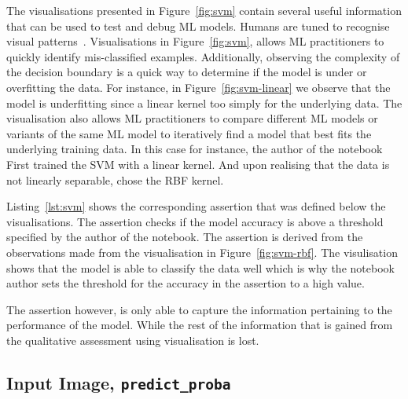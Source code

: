 \documentclass[conference]{IEEEtran}
\begin{document}
The visualisations presented in Figure~\ref{fig:svm} contain several useful information that can be used to test and debug ML models. Humans are tuned to recognise visual patterns~\cite{CITEME}. Visualisations in Figure~\ref{fig:svm}, allows ML practitioners to quickly identify mis-classified examples. Additionally, observing the complexity of the decision boundary is a quick way to determine if the model is under or overfitting the data. For instance, in Figure~\ref{fig:svm-linear} we observe that the model is underfitting since a linear kernel too simply for the underlying data. The visualisation also allows ML practitioners to compare different ML models or variants of the same ML model to iteratively find a model that best fits the underlying training data. In this case for instance, the author of the notebook First trained the SVM with a linear kernel. And upon realising that the data is not linearly separable, chose the RBF kernel.

Listing~\ref{lst:svm} shows the corresponding assertion that was defined below the visualisations. The assertion checks if the model accuracy is above a threshold specified by the author of the notebook. The assertion is derived from the observations made from the visualisation in Figure~\ref{fig:svm-rbf}. The visulisation shows that the model is able to classify the data well which is why the notebook author sets the threshold for the accuracy in the assertion to a high value.

The assertion however, is only able to capture the information pertaining to the performance of the model. While the rest of the information that is gained from the qualitative assessment using visualisation is lost.

\subsection{Input Image, \texttt{predict\_proba}}
\end{document}
